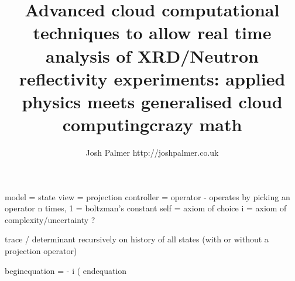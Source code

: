 \documentclass[12pt]{article}  %
\title{Advanced cloud computational techniques to allow real time analysis of XRD/Neutron reflectivity experiments: applied physics meets generalised cloud computing}
\author{Josh Palmer http:\//\//joshpalmer.co.uk}
\renewcommand{\=}[1]{\stackrel{#1}{=}} %
\theoremstyle{definition}
\theoremstyle{remark}
\begin{document}
\title{crazy math}

model = state
view = projection
controller = operator - operates by picking an operator n times, 1 = boltzman's constant
self = axiom of choice
i = axiom of complexity/uncertainty ?

trace / determinant recursively on history of all states (with or without a projection operator)

begin{equation}
 = - i (
end{equation}
\end{document}
